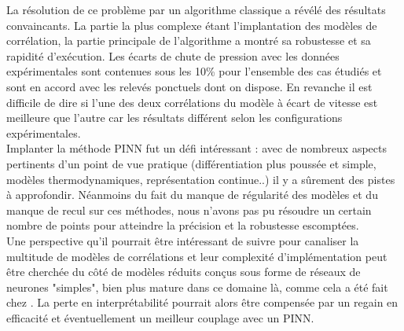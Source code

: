 La résolution de ce problème par un algorithme classique a révélé des résultats convaincants. La partie la plus complexe étant l'implantation des modèles de corrélation, la partie principale de l'algorithme a montré sa robustesse et sa rapidité d'exécution. Les écarts de chute de pression avec les données expérimentales sont contenues sous les 10\% pour l'ensemble des cas étudiés et sont en accord avec les relevés ponctuels dont on dispose. En revanche il est difficile de dire si l'une des deux corrélations du modèle à écart de vitesse est meilleure que l'autre car les résultats différent selon les configurations expérimentales.\\

Implanter la méthode PINN fut un défi intéressant : avec de nombreux aspects pertinents d'un point de vue pratique (différentiation plus poussée et simple, modèles thermodynamiques, représentation continue..) il y a sûrement des pistes à approfondir. Néanmoins du fait du manque de régularité des modèles et du manque de recul sur ces méthodes, nous n'avons pas pu résoudre un certain nombre de points pour atteindre la précision et la robustesse escomptées.\\

Une perspective qu'il pourrait être intéressant de suivre pour canaliser la multitude de modèles de corrélations et leur complexité d'implémentation peut être cherchée du côté de modèles réduits conçus sous forme de réseaux de neurones "simples", bien plus mature dans ce domaine là, comme cela a été fait chez \cite{alvarezdelcastilloNewVoidFraction2012}. La perte en interprétabilité pourrait alors être compensée par un regain en efficacité et éventuellement un meilleur couplage avec un PINN.